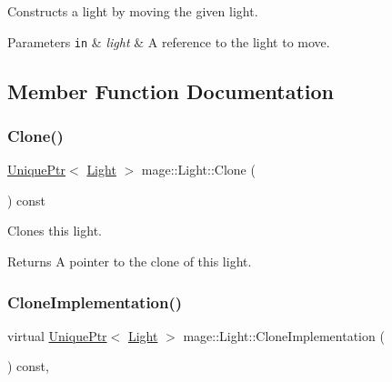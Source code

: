 Constructs a light by moving the given light.


\begin{DoxyParams}[1]{Parameters}
\mbox{\tt in}  & {\em light} & A reference to the light to move. \\
\hline
\end{DoxyParams}


\subsection{Member Function Documentation}
\hypertarget{classmage_1_1_light_a4c87e4a361b20519c49b4a0397625a6a}{}\label{classmage_1_1_light_a4c87e4a361b20519c49b4a0397625a6a} 
\subsubsection{\texorpdfstring{Clone()}{Clone()}}
{\footnotesize\ttfamily \hyperlink{namespacemage_a3316d7143a973e37adf1110f2e80ca31}{Unique\+Ptr}$<$ \hyperlink{classmage_1_1_light}{Light} $>$ mage\+::\+Light\+::\+Clone (\begin{DoxyParamCaption}{ }\end{DoxyParamCaption}) const}

Clones this light.

\begin{DoxyReturn}{Returns}
A pointer to the clone of this light. 
\end{DoxyReturn}
\hypertarget{classmage_1_1_light_aa613d76a1ebda69efde853d15f75490c}{}\label{classmage_1_1_light_aa613d76a1ebda69efde853d15f75490c} 
\subsubsection{\texorpdfstring{Clone\+Implementation()}{CloneImplementation()}}
{\footnotesize\ttfamily virtual \hyperlink{namespacemage_a3316d7143a973e37adf1110f2e80ca31}{Unique\+Ptr}$<$ \hyperlink{classmage_1_1_light}{Light} $>$ mage\+::\+Light\+::\+Clone\+Implementation (\begin{DoxyParamCaption}{ }\end{DoxyParamCaption}) const\hspace{0.3cm}{\ttfamily [private]}, {}}

